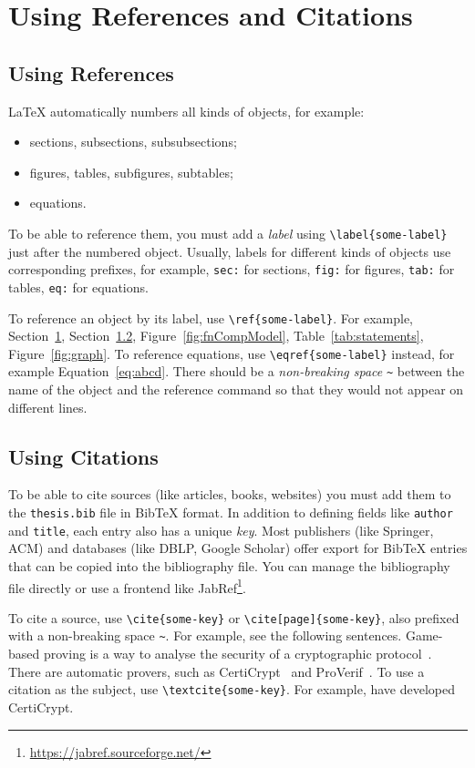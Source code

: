 \section{Using References and Citations}
\label{sec:refs-cites}

\subsection{Using References}
LaTeX automatically numbers all kinds of objects, for example:
\begin{itemize}
    \item sections, subsections, subsubsections;
    \item figures, tables, subfigures, subtables;
    \item equations.
\end{itemize}
To be able to reference them, you must add a \emph{label} using \verb|\label{some-label}| just after the numbered object.
Usually, labels for different kinds of objects use corresponding prefixes, for example, \verb|sec:| for sections, \verb|fig:| for figures, \verb|tab:| for tables, \verb|eq:| for equations.

To reference an object by its label, use \verb|\ref{some-label}|.
For example, Section~\ref{sec:refs-cites}, Section~\ref{sec:cites}, Figure~\ref{fig:fnCompModel}, Table~\ref{tab:statements}, Figure~\ref{fig:graph}.
To reference equations, use \verb|\eqref{some-label}| instead, for example Equation~\eqref{eq:abcd}.
There should be a \emph{non-breaking space} \verb|~| between the name of the object and the reference command so that they would not appear on different lines.


\subsection{Using Citations}
\label{sec:cites}

To be able to cite sources (like articles, books, websites) you must add them to the \verb|thesis.bib| file in BibTeX format.
In addition to defining fields like \verb|author| and \verb|title|, each entry also has a unique \emph{key}.
Most publishers (like Springer, ACM) and databases (like DBLP, Google Scholar) offer export for BibTeX entries that can be copied into the bibliography file.
You can manage the bibliography file directly or use a frontend like JabRef\footnote{\url{https://jabref.sourceforge.net/}}.

To cite a source, use \verb|\cite{some-key}| or \verb|\cite[page]{some-key}|, also prefixed with a non-breaking space \verb|~|.
For example, see the following sentences.
Game-based proving is a way to analyse the security of a cryptographic protocol~\cite{GameB_1,GameB_2}.
There are automatic provers, such as CertiCrypt~\cite{certiCrypt} and ProVerif~\cite{proVerif}.
To use a citation as the subject, use \verb|\textcite{some-key}|.
For example, \textcite{certiCrypt} have developed CertiCrypt.

